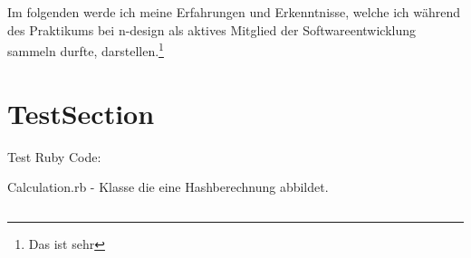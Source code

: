 \documentclass[11pt,a4paper,ngerman]{report}
\begin{document}
Im folgenden werde ich meine Erfahrungen und Erkenntnisse, welche ich während des Praktikums bei n-design als aktives Mitglied der Softwareentwicklung sammeln durfte, darstellen.\footnote{Das ist sehr}

\section{TestSection}
Test Ruby Code:
\begin{listing}
    \caption{Calculation.rb - Klasse die eine Hashberechnung abbildet.}
    \inputminted{ruby}{/Users/pbz/Documents/Projects/hasher_api/app/models/calculation.rb}
    \label{lst:Calculation}
\end{listing}


\clearpage
{}
{}
\listoflistings
\clearpage



\end{document}
